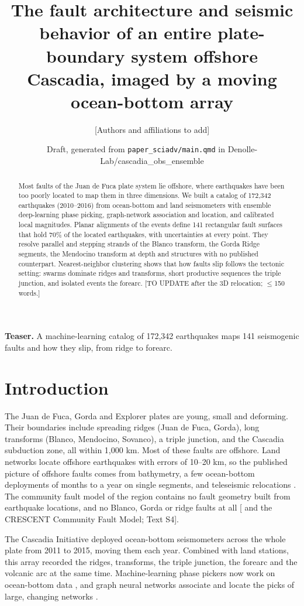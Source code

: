 \documentclass[11pt]{article}
\title{The fault architecture and seismic behavior of an entire plate-boundary system offshore Cascadia, imaged by a moving ocean-bottom array}
\author{[Authors and affiliations to add]}
\date{Draft, generated from \texttt{paper\_sciadv/main.qmd} in Denolle-Lab/cascadia\_obs\_ensemble}
\begin{document}
\maketitle
\begin{abstract}
Most faults of the Juan de Fuca plate system lie offshore, where earthquakes have been too poorly located to map them in three dimensions. We built a catalog of 172,342 earthquakes (2010--2016) from ocean-bottom and land seismometers with ensemble deep-learning phase picking, graph-network association and location, and calibrated local magnitudes. Planar alignments of the events define 141 rectangular fault surfaces that hold 70\% of the located earthquakes, with uncertainties at every point. They resolve parallel and stepping strands of the Blanco transform, the Gorda Ridge segments, the Mendocino transform at depth and structures with no published counterpart. Nearest-neighbor clustering shows that how faults slip follows the tectonic setting: swarms dominate ridges and transforms, short productive sequences the triple junction, and isolated events the forearc. [TO UPDATE after the 3D relocation; \ensuremath{\leq}150 words.]
\end{abstract}
\noindent\textbf{Teaser.} A machine-learning catalog of 172,342 earthquakes maps 141 seismogenic faults and how they slip, from ridge to forearc.

\section{Introduction}\label{introduction}

The Juan de Fuca, Gorda and Explorer plates are young, small and
deforming. Their boundaries include spreading ridges (Juan de Fuca,
Gorda), long transforms (Blanco, Mendocino, Sovanco), a triple junction,
and the Cascadia subduction zone, all within 1,000 km. Most of these
faults are offshore. Land networks locate offshore earthquakes with
errors of 10--20 km, so the published picture of offshore faults comes
from bathymetry, a few ocean-bottom deployments of months to a year on
single segments, and teleseismic relocations
\citep{Braunmiller2008, Ren2023, Lange2026}. The community fault model
of the region contains no fault geometry built from earthquake
locations, and no Blanco, Gorda or ridge faults at all
{[}\citet{Hatem2021} and the CRESCENT Community Fault Model; Text S4{]}.

The Cascadia Initiative deployed ocean-bottom seismometers across the
whole plate from 2011 to 2015, moving them each year. Combined with land
stations, this array recorded the ridges, transforms, the triple
junction, the forearc and the volcanic arc at the same time.
Machine-learning phase pickers now work on ocean-bottom data
\citep{Yuan2023, Bornstein2023, Niksejel2024}, and graph neural networks
associate and locate the picks of large, changing networks
\citep{McBrearty2023, McBrearty2025}.
\end{document}
